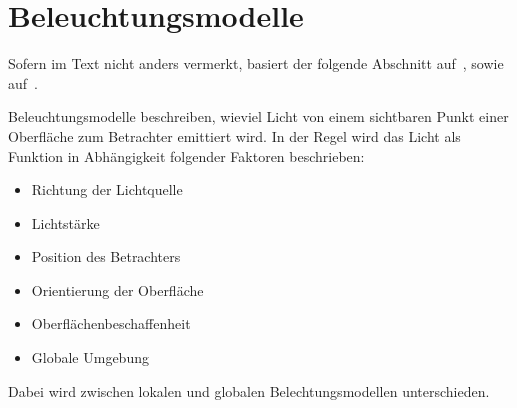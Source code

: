 
\section{Beleuchtungsmodelle}
\label{sec:illumination_models}

Sofern im Text nicht anders vermerkt, basiert der folgende Abschnitt
auf~\cite[S. 343]{whitted_improved_1980}, sowie
auf~\cite{hughes_computer_2013}.

Beleuchtungsmodelle beschreiben, wieviel Licht von einem sichtbaren
Punkt einer Oberfläche zum Betrachter emittiert wird. In der Regel wird
das Licht als Funktion in Abhängigkeit folgender Faktoren beschrieben:

\begin{itemize}
    \item Richtung der Lichtquelle
    \item Lichtstärke
    \item Position des Betrachters
    \item Orientierung der Oberfläche
    \item Oberflächenbeschaffenheit
    \item Globale Umgebung
\end{itemize}

Dabei wird zwischen lokalen und globalen Belechtungsmodellen
unterschieden.




